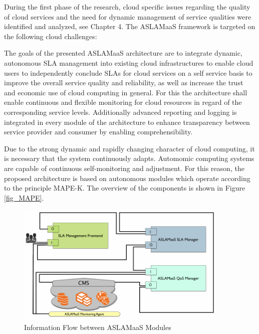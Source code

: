 
During the first phase of the research, cloud specific issues regarding the quality of cloud services and the need for dynamic management of service qualities were identified and analyzed, see Chapter 4. The ASLAMaaS framework is targeted on the following cloud challenges:

The goals of the presented ASLAMaaS architecture are to integrate dynamic, autonomous SLA management into existing cloud infrastructures to enable cloud users to independently conclude SLAs for cloud services on a self service basis to improve the overall service quality and reliability, as well as increase the trust and economic use of cloud computing in general. For this the architecture shall enable continuous and flexible monitoring for cloud resources in regard of the corresponding service levels. Additionally advanced reporting and logging is integrated in every module of the architecture to enhance transparency between service provider and consumer by enabling comprehensibility.

Due to the strong dynamic and rapidly changing character of cloud computing, it is necessary that the system continuously adapts. Automomic computing systems are capable of continuous self-monitoring and adjustment. For this reason, the proposed architecture is based on autonomous modules which operate according to the principle MAPE-K. The overview of the components is shown in Figure \ref{fig_MAPE}.

\begin{figure}[!ht]
\centering
\includegraphics[width=4in]{chapters/chapter4/fig/ASLAMaaS3.PNG}
\caption{Information Flow between ASLAMaaS Modules}
\label{fig_Modules}
\end{figure}


